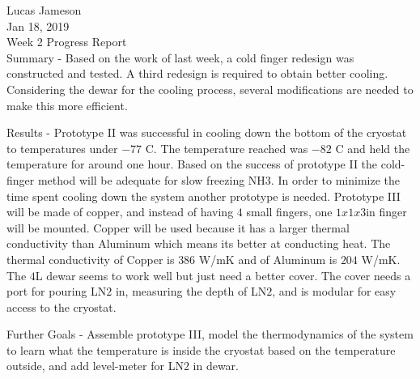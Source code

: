 \documentclass[12pt]{article}
\begin{document}
\noindent Lucas Jameson\\
Jan 18, 2019 \\
Week 2 Progress Report \\

Summary - Based on the work of last week, a cold finger redesign was constructed and tested. A third redesign is required to obtain better cooling. Considering the dewar for the cooling process, several modifications are needed to make this more efficient.  

Results - Prototype II was successful in cooling down the bottom of the cryostat to temperatures under $-77$ C. The temperature reached was $-82$ C and held the temperature for around one hour. Based on the success of prototype II the cold-finger method will be adequate for slow freezing NH$3$. In order to minimize the time spent cooling down the system another prototype is needed. Prototype III will be made of copper, and instead of having $4$ small fingers, one $1x1x3$in finger will be mounted. Copper will be used because it has a larger thermal conductivity than Aluminum which means its better at conducting heat. The thermal conductivity of Copper is $386$ W/mK and of Aluminum is $204$ W/mK. The $4$L dewar seems to work well but just need a better cover. The cover needs a port for pouring LN$2$ in, measuring the depth of LN$2$, and is modular for easy access to the cryostat. 

Further Goals - Assemble prototype III, model the thermodynamics of the system to learn what the temperature is inside the cryostat based on the temperature outside, and add level-meter for LN$2$ in dewar. 
\end{document}

